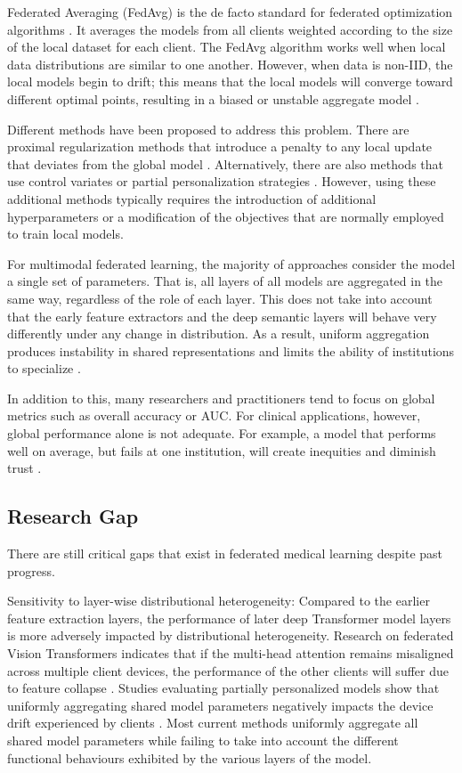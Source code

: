 \documentclass{ieeeaccess}
\begin{document}
Federated Averaging (FedAvg) is the de facto standard for federated optimization algorithms \cite{McMahan2017}. It averages the models from all clients weighted according to the size of the local dataset for each client. The FedAvg algorithm works well when local data distributions are similar to one another. However, when data is non-IID, the local models begin to drift; this means that the local models will converge toward different optimal points, resulting in a biased or unstable aggregate model \cite{Karimireddy2020,Li2020}.

Different methods have been proposed to address this problem. There are proximal regularization methods that introduce a penalty to any local update that deviates from the global model \cite{Li2020}. Alternatively, there are also methods that use control variates or partial personalization strategies \cite{Karimireddy2020,Collins2021}. However, using these additional methods typically requires the introduction of additional hyperparameters or a modification of the objectives that are normally employed to train local models.

For multimodal federated learning, the majority of approaches consider the model a single set of parameters. That is, all layers of all models are aggregated in the same way, regardless of the role of each layer. This does not take into account that the early feature extractors and the deep semantic layers will behave very differently under any change in distribution. As a result, uniform aggregation produces instability in shared representations and limits the ability of institutions to specialize \cite{Zhu2025}.

In addition to this, many researchers and practitioners tend to focus on global metrics such as overall accuracy or AUC. For clinical applications, however, global performance alone is not adequate. For example, a model that performs well on average, but fails at one institution, will create inequities and diminish trust \cite{Darzi2024,Li2021}.

\subsection{Research Gap}

There are still critical gaps that exist in federated medical learning despite past progress.

Sensitivity to layer-wise distributional heterogeneity: Compared to the earlier feature extraction layers, the performance of later deep Transformer model layers is more adversely impacted by distributional heterogeneity. Research on federated Vision Transformers indicates that if the multi-head attention remains misaligned across multiple client devices, the performance of the other clients will suffer due to feature collapse \cite{Darzi2024}. Studies evaluating partially personalized models show that uniformly aggregating shared model parameters negatively impacts the device drift experienced by clients \cite{Zhu2025}. Most current methods uniformly aggregate all shared model parameters while failing to take into account the different functional behaviours exhibited by the various layers of the model.
\end{document}
